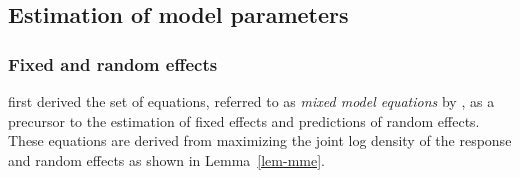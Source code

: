 \documentclass[
  a4paper,
  oneside,
  openany,
  12pt,
  onecolumn]{book}
\theoremstyle{definition}
\theoremstyle{definition}
\theoremstyle{plain}
\theoremstyle{remark}
\begin{document}
\subsection{Estimation of model
parameters}\label{estimation-of-model-parameters}

\subsubsection{Fixed and random effects}\label{fixed-and-random-effects}

\citet{hendersonEstimationEnvironmentalGenetic1959} first derived the
set of equations, referred to as \emph{mixed model equations} by
\citet{smithMultiplicativeMixedModels1999}, as a precursor to the
estimation of fixed effects and predictions of random effects. These
equations are derived from maximizing the joint log density of the
response and random effects as shown in Lemma~\ref{lem-mme}.
\end{document}

